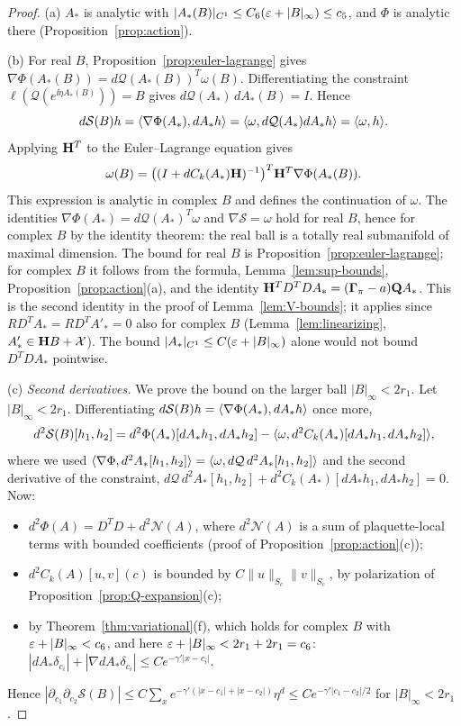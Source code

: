 \begin{proof}
(a) $A_*$ is analytic with $|A_*(B)|_{C^1}\le C_6(\varepsilon+|B|_\infty)\le c_5$, and $\Phi$ is analytic there (Proposition~\ref{prop:action}).

(b) For real $B$, Proposition~\ref{prop:euler-lagrange} gives $\nabla\Phi(A_*(B))=d\mathcal Q(A_*(B))^T\omega(B)$. Differentiating the constraint $\ell(\mathcal Q(e^{\ii\eta A_*(B)}))=B$ gives $d\mathcal Q(A_*)\,dA_*(B)=I$. Hence
\[
d\mathcal S(B)h=\langle \nabla\Phi(A_*),dA_*h\rangle=\langle \omega,d\mathcal Q(A_*)dA_*h\rangle=\langle \omega,h\rangle .
\]
Applying $\mathbf H^T$ to the Euler--Lagrange equation gives
\[
\omega(B)=\big((I+dC_k(A_*)\mathbf H)^{-1}\big)^T\mathbf H^T\nabla\Phi(A_*(B)).
\] This expression is analytic in complex $B$ and defines the continuation of $\omega$. The identities $\nabla\Phi(A_*)=d\mathcal Q(A_*)^T\omega$ and $\nabla\mathcal S=\omega$ hold for real $B$, hence for complex $B$ by the identity theorem: the real ball is a totally real submanifold of maximal dimension. The bound for real $B$ is Proposition~\ref{prop:euler-lagrange}; for complex $B$ it follows from the formula, Lemma~\ref{lem:sup-bounds}, Proposition~\ref{prop:action}(a), and the identity $\mathbf H^TD^TDA_*=(\boldsymbol\Gamma_\pi-a)\mathbf Q A_*$. This is the second identity in the proof of Lemma~\ref{lem:V-bounds}; it applies since $RD^TA_*=RD^TA'_*=0$ also for complex $B$ (Lemma~\ref{lem:linearizing}, $A'_*\in\mathbf H B+\mathcal X$). The bound $|A_*|_{C^1}\le C(\varepsilon+|B|_\infty)$ alone would not bound $D^TDA_*$ pointwise.

(c) \emph{Second derivatives.} We prove the bound on the larger ball $|B|_\infty<2r_1$. Let $|B|_\infty<2r_1$. Differentiating $d\mathcal S(B)h=\langle \nabla\Phi(A_*),dA_*h\rangle$ once more,
\[
d^2\mathcal S(B)[h_1,h_2]=d^2\Phi(A_*)[dA_*h_1,dA_*h_2]-\langle \omega,d^2C_k(A_*)[dA_*h_1,dA_*h_2]\rangle,
\]
where we used $\langle \nabla\Phi,d^2A_*[h_1,h_2]\rangle=\langle \omega,d\mathcal Q\,d^2A_*[h_1,h_2]\rangle$ and the second derivative of the constraint, $d\mathcal Q\,d^2A_*[h_1,h_2]+d^2C_k(A_*)[dA_*h_1,dA_*h_2]=0$. Now:
\begin{itemize}
\item $d^2\Phi(A)=D^TD+d^2\mathcal N(A)$, where $d^2\mathcal N(A)$ is a sum of plaquette-local terms with bounded coefficients (proof of Proposition~\ref{prop:action}(c));
\item $d^2C_k(A)[u,v](c)$ is bounded by $C\|u\|_{S_c}\|v\|_{S_c}$, by polarization of Proposition~\ref{prop:Q-expansion}(c);
\item by Theorem~\ref{thm:variational}(f), which holds for complex $B$ with $\varepsilon+|B|_\infty<c_6$, and here $\varepsilon+|B|_\infty<2r_1+2r_1=c_6$: $|dA_*\delta_{c_i}|+|\nabla dA_*\delta_{c_i}|\le Ce^{-\gamma'|x-c_i|}$.
\end{itemize}
Hence $|\partial_{c_1}\partial_{c_2}\mathcal S(B)|\le C\sum_xe^{-\gamma'(|x-c_1|+|x-c_2|)}\eta^d\le Ce^{-\gamma'|c_1-c_2|/2}$ for $|B|_\infty<2r_1$.


\end{proof}
